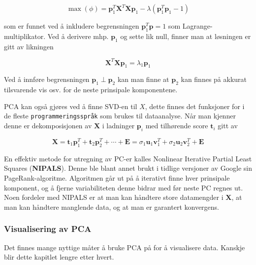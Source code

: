 \begin{equation}
	\max (\phi)=\boldsymbol{p}_{1}^{T} \boldsymbol{X}^{T} \boldsymbol{X} \boldsymbol{p}_{1}-\lambda\left(\boldsymbol{p}_{1}^{T} \boldsymbol{p}_{1}-1\right)
\end{equation}

som er funnet ved å inkludere begrensningen $\mathbf{p}_1^T \mathbf{p} = 1$ som Lagrange-multiplikator. Ved å derivere mhp. $\mathbf{p}_1$ og sette lik null, finner man at løsningen er gitt av likningen

\begin{equation}
	\mathbf{X}^T \mathbf{X} \mathbf{p}_1 = \lambda_1 \mathbf{p}_1
\end{equation}

Ved å innføre begrensningen $\mathbf{p}_1 \perp \mathbf{p}_2$ kan man finne at $\mathbf{p}_2$ kan finnes på akkurat tilsvarende vis osv. for de neste prinsipale komponentene.

PCA kan også gjøres ved å finne SVD-en til $X$, dette finnes det funksjoner for i de fleste \texttt{programmeringsspråk} som brukes til dataanalyse. Når man kjenner denne er dekomposisjonen av $\mathbf{X}$ i ladninger $\mathbf{p}_i$ med tilhørende score $\mathbf{t}_i$ gitt av

\begin{equation}
	\mathbf{X} = \mathbf{t}_1 \mathbf{p}_1^T + \mathbf{t}_2 \mathbf{p}_2^T + \cdots + \mathbf{E} = \sigma_1 \mathbf{u}_1 \mathbf{v}_1^T +  \sigma_2 \mathbf{u}_2 \mathbf{v}_2^T + \mathbf{E} 
\end{equation}

En effektiv metode for utregning av PC-er kalles Nonlinear Iterative Partial Least Squares (\textbf{NIPALS}). Denne ble blant annet brukt i tidlige versjoner av Google sin PageRank-algoritme. Algoritmen går ut på å iterativt finne hver prinsipale komponent, og å fjerne variabiliteten denne bidrar med før neste PC regnes ut. Noen fordeler med NIPALS er at man kan håndtere store datamengder i $\mathbf{X}$, at man kan håndtere manglende data, og at man er garantert konvergens.

\subsubsection{Visualisering av PCA}
Det finnes mange nyttige måter å bruke PCA på for å visualisere data. Kanskje blir dette kapitlet lengre etter hvert.

